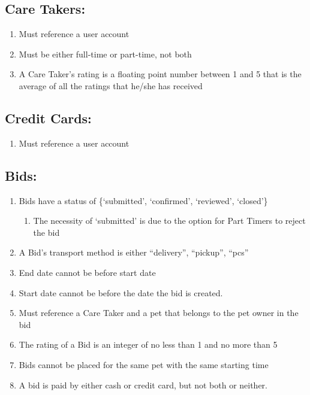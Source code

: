 \documentclass[
  paper=a4,
  ,captions=tableheading
]{scrartcl}
\providecommand{\tightlist}{%
  \setlength{\itemsep}{0pt}\setlength{\parskip}{0pt}}
\begin{document}
\hypertarget{care-takers}{%
\subsection{Care Takers:}\label{care-takers}}

\begin{enumerate}
\def\labelenumi{\arabic{enumi}.}
\tightlist
\item
  Must reference a user account
\item
  Must be either full-time or part-time, not both
\item
  A Care Taker's rating is a floating point number between 1 and 5 that
  is the average of all the ratings that he/she has received
\end{enumerate}

\hypertarget{credit-cards}{%
\subsection{Credit Cards:}\label{credit-cards}}

\begin{enumerate}
\def\labelenumi{\arabic{enumi}.}
\tightlist
\item
  Must reference a user account
\end{enumerate}

\hypertarget{bids}{%
\subsection{Bids:}\label{bids}}

\begin{enumerate}
\def\labelenumi{\arabic{enumi}.}
\setcounter{enumi}{1}
\tightlist
\item
  Bids have a status of \{`submitted', `confirmed', `reviewed',
  `closed'\}

  \begin{enumerate}
  \def\labelenumii{\arabic{enumii}.}
  \tightlist
  \item
    The necessity of `submitted' is due to the option for Part Timers to
    reject the bid
  \end{enumerate}
\item
  A Bid's transport method is either ``delivery'', ``pickup'', ``pcs''
\item
  End date cannot be before start date
\item
  Start date cannot be before the date the bid is created.
\item
  Must reference a Care Taker and a pet that belongs to the pet owner in
  the bid
\item
  The rating of a Bid is an integer of no less than 1 and no more than 5
\item
  Bids cannot be placed for the same pet with the same starting time
\item
  A bid is paid by either cash or credit card, but not both or neither.
\end{enumerate}
\end{document}

